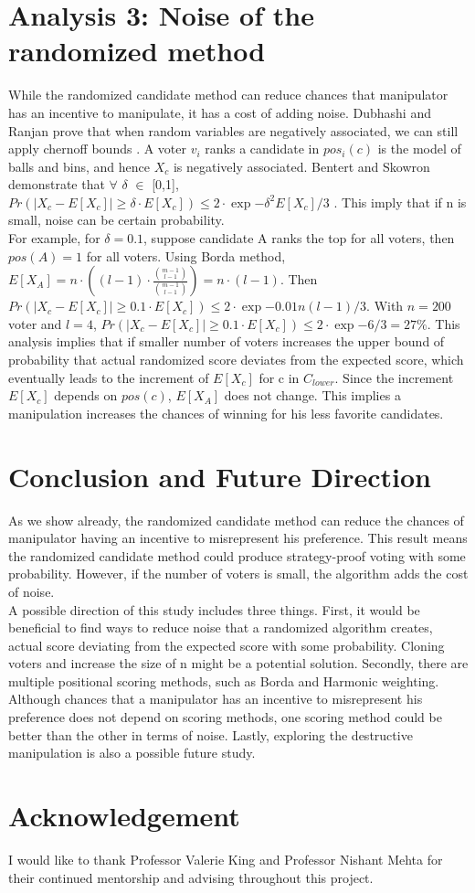 \documentclass[letterpaper]{article} %
\begin{document}
\section{Analysis 3: Noise of the randomized method}
While the randomized candidate method can reduce chances that manipulator has an incentive to manipulate, it has a cost of adding noise. Dubhashi and Ranjan prove that when random variables are negatively associated, we can still apply chernoff bounds \cite{BRICS}. A voter $v_i$ ranks a candidate in $pos_i(c)$ is the model of balls and bins, and hence $X_c$ is negatively associated. Bentert and Skowron demonstrate that $\forall$ $\delta$ $\in$ [0,1], $Pr(|X_c-E[X_c]| \geq \delta\cdot E[X_c]) \leq 2\cdot\exp{-\delta^2E[X_c]/3} $ \cite{Skowron}. This imply that if n is small, noise can be certain probability. \\
For example, for $\delta = 0.1$,  suppose candidate A ranks the top for all voters, then $pos(A) = 1$ for all voters. Using Borda method, $E[X_A]=n\cdot((l-1)\cdot \frac{\binom{m-1}{l-1}}{\binom{m-1}{l-1}}) = n\cdot(l-1).$ Then $Pr(|X_c-E[X_c]| \geq 0.1\cdot E[X_c]) \leq 2\cdot\exp{-0.01n(l-1)/3} $.
With $n=200$ voter and $l=4$, $Pr(|X_c-E[X_c]| \geq 0.1\cdot E[X_c]) \leq 2\cdot\exp{-6/3} = 27\%$.
This analysis implies that if smaller number of voters increases the upper bound of probability that actual randomized score deviates from the expected score, which eventually leads to the increment of $E[X_c]$ for c in $C_{lower}$. Since the increment $E[X_c]$ depends on $pos(c)$, $E[X_A]$ does not change. This implies a manipulation increases the chances of winning for his less favorite candidates.

\section{Conclusion and Future Direction}
As we show already, the randomized candidate method can reduce the chances of manipulator having an incentive to misrepresent his preference. This result means the randomized candidate method could produce strategy-proof voting with some probability. However, if the number of voters is small, the algorithm adds the cost of noise.\\
A possible direction of this study includes three things. First, it would be beneficial to find ways to reduce noise that a randomized algorithm creates, actual score deviating from the expected score with some probability. Cloning voters and increase the size of n might be a potential solution.
Secondly, there are multiple positional scoring methods, such as Borda and Harmonic weighting. Although chances that a manipulator has an incentive to misrepresent his preference does not depend on scoring methods, one scoring method could be better than the other in terms of noise. Lastly, exploring the destructive manipulation is also a possible future study.


\section{Acknowledgement}
I would like to thank Professor Valerie King and Professor Nishant Mehta for their continued mentorship and advising throughout this project.




\end{document}
